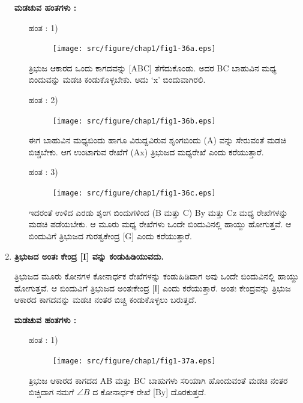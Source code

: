 \begin{enumerate}
    \noindent
 \textbf{ಮಡಚುವ ಹಂತಗಳು :}
 
 \begin{itemize}
 \item[ಹಂತ : 1)] 
 ~
 \begin{figure}[H]
\centering
\texttt{[image: src/figure/chap1/fig1-36a.eps]}
\end{figure}
 
ತ್ರಿಭುಜ ಆಕಾರದ ಒಂದು ಕಾಗದವನ್ನು [ABC] ತೆಗೆದುಕೊಂಡು. ಅದರ BC ಬಾಹುವಿನ ಮಧ್ಯ ಬಿಂದುವನ್ನು ಮಡಚಿ ಕಂಡುಕೊಳ್ಳಬೇಕು. ಅದು  `x' ಬಿಂದುವಾಗಿರಲಿ. 
 
 \item[ಹಂತ : 2)]
 ~
 \begin{figure}[H]
\centering
\texttt{[image: src/figure/chap1/fig1-36b.eps]}
\end{figure}
 
 ಈಗ ಬಾಹುವಿನ ಮಧ್ಯಬಿಂದು ಹಾಗೂ ವಿರುದ್ದವಿರುವ ಶೃಂಗಬಿಂದು (A) ವನ್ನು ಸೇರುವಂತೆ ಮಡಚಿ ಬಿಚ್ಚಬೇಕು. ಆಗ ಉಂಟಾಗುವ ರೇಖೆಗೆ (Ax) ತ್ರಿಭುಜದ ಮಧ್ಯರೇಖೆ ಎಂದು ಕರೆಯುತ್ತಾರೆ. 
 
 \item[ಹಂತ : 3)]
 ~
 \begin{figure}[H]
\centering
\texttt{[image: src/figure/chap1/fig1-36c.eps]}
\end{figure}
 
 ಇದರಂತೆ ಉಳಿದ ಎರಡು ಶೃಂಗ ಬಿಂದುಗಳಿಂದ (B ಮತ್ತು C) By ಮತ್ತು  Cz ಮಧ್ಯ ರೇಖೆಗಳನ್ನು ಮಡಚಿ ಪಡೆಯಬೇಕು. ಆ ಮೂರು ಮಧ್ಯ ರೇಖೆಗಳು ಒಂದೇ ಬಿಂದುವಿನಲ್ಲಿ  ಹಾಯ್ದು ಹೋಗುತ್ತವೆ. ಆ ಬಿಂದುವಿಗೆ ತ್ರಿಭುಜದ ಗುರತ್ವಕೇಂದ್ರ  [G] ಎಂದು ಕರೆಯುತ್ತಾರೆ. 
  \end{itemize}
 
 \item \textbf{ತ್ರಿಭುಜದ ಅಂತಃ ಕೇಂದ್ರ [I] ವನ್ನು ಕಂಡುಹಿಡಿಯುವದು. }  
 
 ತ್ರಿಭುಜದ ಮೂರು ಕೋನಗಳ ಕೋನಾರ್ಧಕ ರೇಖೆಗಳನ್ನು ಕಂಡುಹಿಡಿದಾಗ ಅವು ಒಂದೇ ಬಿಂದುವಿನಲ್ಲಿ ಹಾಯ್ದು ಹೋಗುತ್ತವೆ. ಆ ಬಿಂದುವಿಗೆ ತ್ರಿಭುಜದ ಅಂತಃ\break ಕೇಂದ್ರ [I]  ಎಂದು ಕರೆಯುತ್ತಾರೆ. ಅಂತಃ ಕೇಂದ್ರವನ್ನು ತ್ರಿಭುಜ ಆಕಾರದ ಕಾಗದವನ್ನು ಮಡಚಿ ನಂತರ ಬಿಚ್ಚಿ ಕಂಡುಕೊಳ್ಳಲು ಬರುತ್ತದೆ. 
 
 
 
    \noindent
 \textbf{ಮಡಚುವ ಹಂತಗಳು :}
  \begin{itemize}
 \item[ಹಂತ : 1)] 
 ~
 \begin{figure}[H]
\centering
\texttt{[image: src/figure/chap1/fig1-37a.eps]}
\end{figure}
  
 
 ತ್ರಿಭುಜ ಆಕಾರದ ಕಾಗದದ  AB ಮತ್ತು BC ಬಾಹುಗಳು ಸರಿಯಾಗಿ ಹೊಂದುವಂತೆ ಮಡಚಿ ನಂತರ ಬಿಚ್ಚಿದಾಗ ನಮಗೆ $\angle B$ ದ ಕೋನಾರ್ಧಕ ರೇಖೆ  [By] ದೊರಕುತ್ತದೆ. 
 

\end{itemize}
\end{enumerate}
